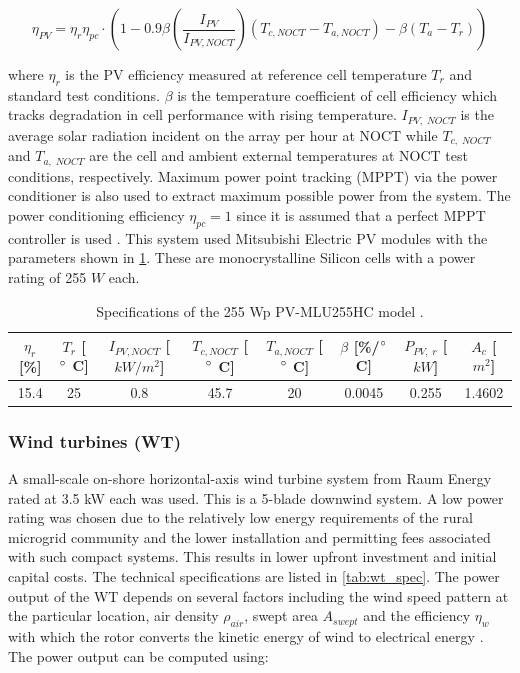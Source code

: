 \documentclass[final,3p,times]{elsarticle}
\begin{document}
\begin{equation}
\label{eq:pv2}
    \eta_{PV} = \eta_r \eta_{pc} \cdot \left(1 - 0.9 \beta \left(\frac{I_{PV}}{I_{PV,NOCT}}\right)(T_{c,NOCT} - T_{a,NOCT}) -\beta(T_a - T_r)\right)
\end{equation}

\noindent where $\eta_r$ is the PV efficiency measured at reference cell temperature $T_r$ and standard test conditions. $\beta$ is the temperature coefficient of cell efficiency which tracks degradation in cell performance with rising temperature. $I_{PV,\;NOCT}$ is the average solar radiation incident on the array per hour at NOCT while $T_{c,\;NOCT}$ and $T_{a,\;NOCT}$ are the cell and ambient external temperatures at NOCT test conditions, respectively. Maximum power point tracking (MPPT) via the power conditioner is also used to extract maximum possible power from the system. The power conditioning efficiency $\eta_{pc}= 1$ since it is assumed that a perfect MPPT controller is used \cite{kaabeche2011b}. This system used Mitsubishi Electric PV modules with the parameters shown in \cref{tab:pv_cell}. These are monocrystalline Silicon cells with a power rating of 255 $W$ each. 

\begin{table}[htbp]
\centering
\begin{tabular}{@{}cccccccc@{}}
\toprule
$\eta_r$ [\%]  & $T_r$ [$\degree$ C] & $I_{PV,NOCT}$ [$kW/m^2$]  & $T_{c,NOCT}$ [$\degree$ C]  & $T_{a,NOCT}$ [$\degree$ C] & $\beta$ [\%/$\degree$ C] & $P_{PV,\;r}$ [$kW$] & $A_c$ [$m^2$] \\ \midrule
15.4 & 25 & 0.8 & 45.7 & 20 & 0.0045 & 0.255 & 1.4602
\\ \bottomrule
\end{tabular}
\caption{Specifications of the 255 Wp PV-MLU255HC model \cite{mitsubishi}.}
\label{tab:pv_cell} 
\end{table}

\subsubsection{Wind turbines (WT)}

A small-scale on-shore horizontal-axis wind turbine system from Raum Energy rated at 3.5 kW each was used. This is a 5-blade downwind system. A low power rating was chosen due to the relatively low energy requirements of the rural microgrid community and the lower installation and permitting fees associated with such compact systems. This results in lower upfront investment and initial capital costs. The technical specifications are listed in \cref{tab:wt_spec}. The power output of the WT depends on several factors including the wind speed pattern at the particular location, air density $\rho_{air}$, swept area $A_{swept}$ and the efficiency $\eta_w$ with which the rotor converts the kinetic energy of wind to electrical energy \cite{tazvinga2014}. The power output can be computed using:
\end{document}
